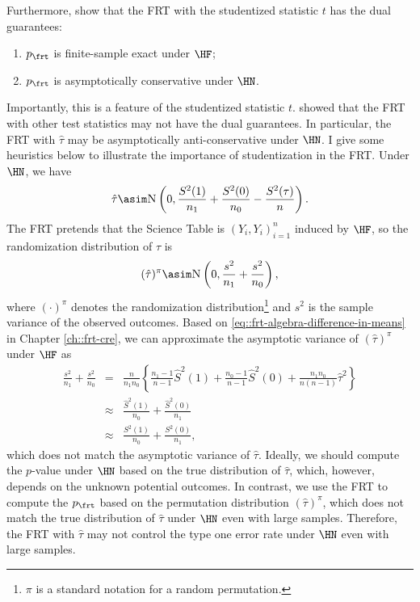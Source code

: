 Furthermore, \citet{ding2017randomization} show that the FRT with the studentized statistic $t$ has the dual guarantees:
\begin{enumerate}
\item 
 $p_\frt$ is finite-sample exact under $\HF$;
\item
 $p_\frt$ is asymptotically conservative under $\HN$.
\end{enumerate}
Importantly, this is a feature of the studentized statistic $t$. \citet{ding2017randomization} showed that the FRT with other test statistics may not have the dual guarantees. In particular, the FRT with $\hat{\tau}$ may be asymptotically anti-conservative under $\HN$. I give some heuristics below to illustrate the importance of studentization in the FRT. 
Under $\HN$, we have
$$
\hat{\tau} \asim \textsc{N}\left(0,    \frac{S^2(1)}{n_1} + \frac{S^2(0)}{n_0} -  \frac{S^2(\tau)}{n}    \right).
$$
The FRT pretends that the Science Table is $(Y_i, Y_i)_{i=1}^n$ induced by $\HF$, so the randomization distribution of $\hat{\tau} $ is
$$
(\hat{\tau} )^\pi \asim \textsc{N}\left(0,    \frac{s^2}{n_1} + \frac{s^2}{n_0}    \right),
$$
where $(\cdot)^\pi$ denotes the randomization distribution\footnote{$\pi$ is a standard notation for a random permutation.}
 and 
$
s^2 
$
is the sample variance of the observed outcomes. Based on \eqref{eq::frt-algebra-difference-in-means} in Chapter \ref{ch::frt-cre}, we can approximate the asymptotic variance of $(\hat{\tau} )^\pi$ under $\HF$ as
\begin{eqnarray*}
\frac{s^2}{n_1} + \frac{s^2}{n_0} 
& =& \frac{n}{n_1 n_0}  \left\{ 
 \frac{n_1 -1}{ n-1 } \hat S^2(1) + \frac{n_0 - 1}{n-1} \hat S^2(0) + \frac{n_1n_0}{n(n-1)} \hat\tau^2
 \right\} \\
&\approx & \frac{\hat S^2(1) }{n_0} +  \frac{\hat S^2(0) }{n_1} \\ 
&\approx & \frac{  S^2(1) }{n_0} +  \frac{  S^2(0) }{n_1},
\end{eqnarray*}
 which does not match the asymptotic variance of $\hat{\tau} $. Ideally, we should compute the $p$-value under $\HN$ based on the true distribution of $\hat{\tau} $, which, however, depends on the unknown potential outcomes. In contrast, we use the FRT to compute the $p_\frt$ based on the permutation distribution $(\hat{\tau} )^\pi $, which does not match the true distribution of $\hat{\tau} $ under $\HN$ even with large samples. Therefore, the FRT with $\hat\tau$ may not control the type one error rate under $\HN$ even with large samples. 
 
